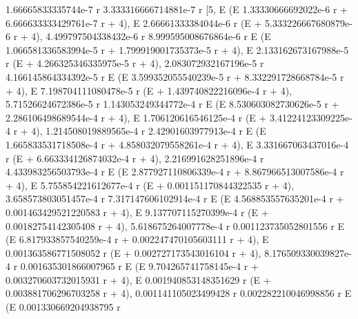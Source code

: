 \documentclass{article}
\begin{document}
    
                 1.66665833335744e-7 r   3.333316666714881e-7 r
            [5, E                      (E
                                     1.33330666692022e-6 r
     + 6.666633333429761e-7 r + 4), E
       2.66661333384044e-6 r
     (E                      + 5.333226667680879e-6 r + 4), 
     4.499797504338432e-6 r   8.999595008676864e-6 r
    E                       (E
                                     1.066581336583994e-5 r
     + 1.799919001735373e-5 r + 4), E
       2.133162673167988e-5 r
     (E                       + 4.266325346335975e-5 r + 4), 
     2.083072932167196e-5 r   4.166145864334392e-5 r
    E                       (E
                                     3.599352055540239e-5 r
     + 8.332291728668784e-5 r + 4), E
       7.198704111080478e-5 r
     (E                       + 1.439740822216096e-4 r + 4), 
     5.71526624672386e-5 r   1.143053249344772e-4 r
    E                      (E
                                     8.530603082730626e-5 r
     + 2.286106498689544e-4 r + 4), E
       1.706120616546125e-4 r
     (E                       + 3.41224123309225e-4 r + 4), 
     1.214508019889565e-4 r   2.42901603977913e-4 r
    E                       (E
                                     1.665833531718508e-4 r
     + 4.858032079558261e-4 r + 4), E
       3.331667063437016e-4 r
     (E                       + 6.663334126874032e-4 r + 4), 
     2.216991628251896e-4 r   4.433983256503793e-4 r
    E                       (E
                                     2.877927110806339e-4 r
     + 8.867966513007586e-4 r + 4), E
       5.755854221612677e-4 r
     (E                       + 0.001151170844322535 r + 4), 
     3.658573803051457e-4 r   7.317147606102914e-4 r
    E                       (E
                                     4.568853557635201e-4 r
     + 0.001463429521220583 r + 4), E
       9.137707115270399e-4 r
     (E                       + 0.00182754142305408 r + 4), 
     5.618675264007778e-4 r   0.001123735052801556 r
    E                       (E
                                     6.817933857540259e-4 r
     + 0.002247470105603111 r + 4), E
       0.001363586771508052 r
     (E                       + 0.002727173543016104 r + 4), 
     8.176509330039827e-4 r   0.001635301866007965 r
    E                       (E
                                     9.704265741758145e-4 r
     + 0.003270603732015931 r + 4), E
       0.001940853148351629 r
     (E                       + 0.003881706296703258 r + 4), 
     0.001141105023499428 r   0.002282210046998856 r
    E                       (E
                                     0.001330669204938795 r
\end{document}
